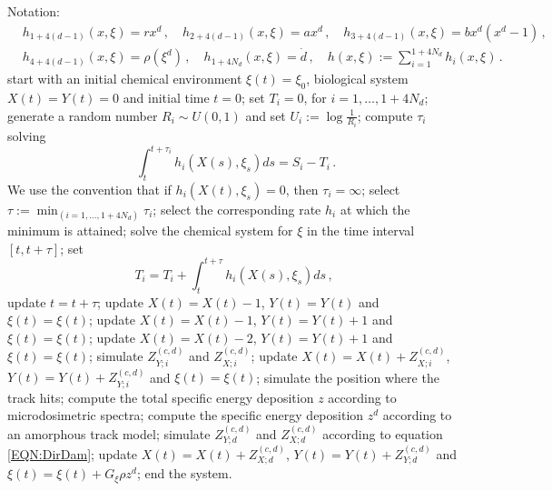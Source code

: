 \documentclass[10pt]{iopart}
\numberwithin{table}{section}
\begin{document}
\begin{algorithm}
\caption{MS-GSM$^2$}\label{alg:MSGSM2}
\begin{algorithmic}[1]
    \State Notation:
    \[
    \begin{split}
        &h_{1+4(d-1)}(x,\xi)=rx^d\,,\quad h_{2+4(d-1)}(x,\xi)=ax^d\,,\quad h_{3+4(d-1)}(x,\xi)=bx^d(x^d-1)\,,\\
        & h_{4+4(d-1)}(x,\xi)=\rho(\xi^d) \,,\quad h_{1+4 N_d}(x,\xi)=\dot{d}\,,\quad h(x,\xi) :=  \sum_{i=1}^{1+4 N_d} h_i(x,\xi)\,.
    \end{split}
    \]
    \State start with an initial chemical environment $\xi(t)=\xi_0$, biological system $X(t)=Y(t)=0$ and initial time $t=0$;
    \State set $T_i=0$, for $i=1,\dots,1+4 N_d$;
            \State generate a random number $R_i \sim U(0,1)$ and set $U_i := \log \frac{1}{R_i}$;
            \State compute $\tau_i$ solving
            \[
            \int_t^{t+\tau_i} h_i(X(s),\xi_s)ds = S_i - T_i\,.
            \]
            \qquad \quad We use the convention that if $h_i(X(t),\xi_s)=0$, then $\tau_i = \infty$;
        \EndFor
        \State select $\tau := \min_{(i=1,\dots,1+4 N_d)} \tau_i$;
        \State select the corresponding rate $h_i$ at which the minimum is attained;
        \State solve the chemical system for $\xi$ in the time interval $[t,t+\tau]$;
            \State set 
            \[
            T_i=T_i + \int_t^{t+\tau} h_i(X(s),\xi_s)ds\,,\;
            \]
            \State update $t=t+\tau$;
                \State update $X(t) = X(t) - 1$, $Y(t)=Y(t)$ and $\xi(t) = \xi(t)$;
                \State update $X(t) = X(t) - 1$, $Y(t)=Y(t)+1$ and $\xi(t) = \xi(t)$;
                \State update $X(t) = X(t) - 2$, $Y(t)=Y(t)+1$ and $\xi(t) = \xi(t)$;
                \State simulate $Z_{Y;i}^{(c,d)}$ and $Z_{X;i}^{(c,d)}$; 
                \State update $X(t) = X(t) + Z_{X;i}^{(c,d)}$, $Y(t)=Y(t)+Z_{Y;i}^{(c,d)}$ and $\xi(t) = \xi(t)$;
                \State simulate the position where the track hits;
                \State compute the total specific energy deposition $z$ according to microdosimetric spectra;
                    \State compute the specific energy deposition $z^d$ according to an amorphous track model;
                    \State simulate $Z_{Y;d}^{(c,d)}$ and $Z_{X;d}^{(c,d)}$ according to equation \eqref{EQN:DirDam};
                    \State update $X(t) = X(t) + Z_{X;d}^{(c,d)}$, $Y(t)=Y(t)+Z_{Y;d}^{(c,d)}$ and $\xi(t) = \xi(t)+ G_\xi \rho z^d$;
                \EndFor
            \EndIf 
        \EndFor
    \EndWhile
    \State end the system.
\end{algorithmic}
\end{algorithm}
\end{document}
